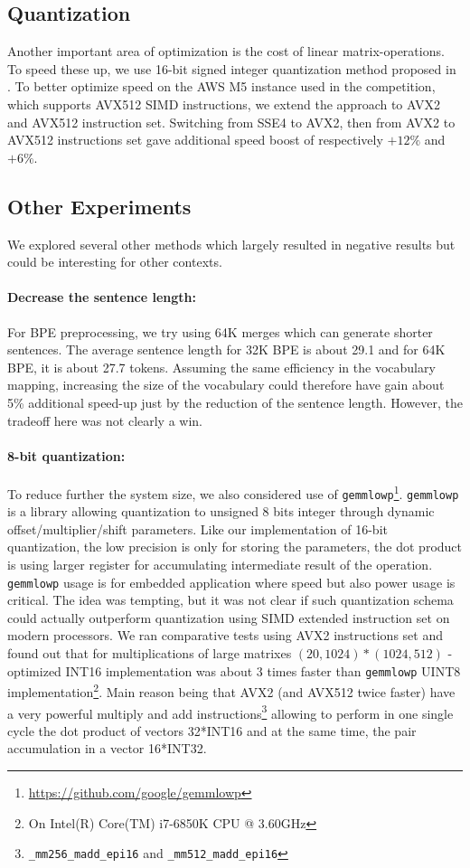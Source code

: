 \documentclass[11pt,a4paper]{article}
\begin{document}
\subsection{Quantization}
\label{quantize}
Another important area of optimization is the cost of linear
matrix-operations.  To speed these up, we use 16-bit signed integer
quantization method proposed in .
To better optimize speed on the AWS M5 instance used in the
competition, which supports AVX512 SIMD instructions, we extend the
approach to AVX2 and AVX512 instruction set. Switching from SSE4 to AVX2, then from
AVX2 to AVX512 instructions set gave additional speed boost of
respectively $+12\%$ and $+6\%$.

\subsection{Other Experiments}
We explored several other methods which largely resulted in
negative results but could be interesting for other contexts.

\paragraph{Decrease the sentence length:}
For BPE preprocessing, we try using 64K merges which can generate shorter sentences.
The average sentence length for 32K BPE is about 29.1 and for 64K BPE, it is about 27.7 tokens. Assuming the same efficiency in the vocabulary mapping, increasing the size of the vocabulary could therefore have gain about 5\% additional speed-up just by the reduction of the sentence length. However, the tradeoff here was not clearly a win.

 \paragraph{8-bit quantization:}
To reduce further the system size, we also considered use of {\tt gemmlowp}\footnote{\url{https://github.com/google/gemmlowp}}. {\tt gemmlowp} is a library allowing quantization to unsigned 8 bits integer through dynamic offset/multiplier/shift parameters. Like our implementation of 16-bit quantization, the low precision is only for storing the parameters, the dot product is using larger register for accumulating intermediate result of the operation. {\tt gemmlowp} usage is for embedded application where speed but also power usage is critical. The idea was tempting, but it was not clear if such quantization schema could actually outperform quantization using SIMD extended instruction set on modern processors. We ran  comparative tests using AVX2 instructions set and found out that for multiplications of large matrixes $(20,1024) * (1024,512)$ - optimized INT16 implementation was about 3 times faster than  {\tt gemmlowp} UINT8 implementation\footnote{On Intel(R) Core(TM) i7-6850K CPU @ 3.60GHz}. Main reason being that AVX2 (and AVX512 twice faster) have a very powerful multiply and add instructions\footnote{{\tt \_mm256\_madd\_epi16} and {\tt \_mm512\_madd\_epi16}} allowing to perform in one single cycle the dot product of vectors 32*INT16 and at the same time, the pair accumulation in a vector 16*INT32.
\end{document}
